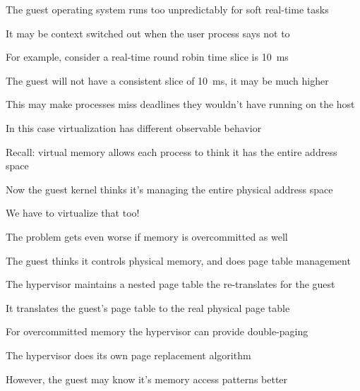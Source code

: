  \begin{slide}
    

    The guest operating system runs too unpredictably for soft real-time tasks

    \leftspace{}It may be context switched out when the user process says not
    to
    \medskip

    For example, consider a real-time round robin time slice is 10~ms

    \leftspace{}The guest will not have a consistent slice of 10~ms, it may be
                 much higher
    \medskip

    This may make processes miss deadlines they wouldn't have running on the host

    \leftspace{}In this case virtualization has different observable behavior

  \end{slide}

  \begin{slide}
    

    Recall: virtual memory allows each process to think it has the entire
            address space
    \medskip

    Now the guest kernel thinks it's managing the entire physical address space

    \leftspace{}We have to virtualize that too!
    \medskip

    The problem gets even worse if memory is overcommitted as well

  \end{slide}

  \begin{slide}
    

    The guest thinks it controls physical memory, and does page table management
    \medskip

    The hypervisor maintains a nested page table the re-translates for the guest

    \leftspace{}It translates the guest's page table to the real physical page
                 table
    \medskip

    For overcommitted memory the hypervisor can provide double-paging

    \leftspace{}The hypervisor does its own page replacement algorithm

    \leftspace{}\leftspace{}However, the guest may know it's memory access
    patterns better

  \end{slide}

